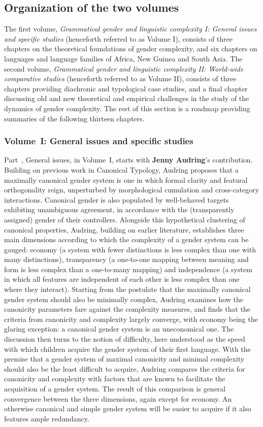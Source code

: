 \documentclass[output=collectionpaper]{langsci/langscibook}
\begin{document}
\subsection*{Organization of the two volumes}
The first volume, \textit{Grammatical gender and linguistic complexity I: General issues and specific studies} (henceforth referred to as Volume I), consists of three chapters on the theoretical foundations of gender complexity, and six chapters on languages and language families of Africa, New Guinea and South Asia. The second volume, \textit{Grammatical gender and linguistic complexity II: World-wide comparative studies} (henceforth referred to as Volume II), consists of three chapters providing diachronic and typological case studies, and a final chapter discussing old and new theoretical and empirical challenges in the study of the dynamics of gender complexity. The rest of this section is a roadmap providing summaries of the following thirteen chapters.

\subsubsection*{Volume~I: General issues and specific studies}
Part~\ptgeneral{}, General issues, in Volume~I, starts with \textbf{Jenny Audring}'s contribution. Building on previous work in Canonical Typology, Audring proposes that a maximally canonical gender system is one in which formal clarity and featural orthogonality reign, unperturbed by morphological cumulation and cross-category interactions. Canonical gender is also populated by well-behaved targets exhibiting unambiguous agreement, in accordance with the (transparently assigned) gender of their controllers. Alongside this hypothetical clustering of canonical properties, Audring, building on earlier literature, establishes three main dimensions according to which the complexity of a gender system can be gauged: economy (a system with fewer distinctions is less complex than one with many distinctions), transparency (a one-to-one mapping between meaning and form is less complex than a one-to-many mapping) and independence (a system in which all features are independent of each other is less complex than one where they interact). Starting from the postulate that the maximally canonical gender system should also be minimally complex, Audring examines how the canonicity parameters fare against the complexity measures, and finds that the criteria from canonicity and complexity largely converge, with economy being the glaring exception: a canonical gender system is an uneconomical one. The discussion then turns to the notion of difficulty, here understood as the speed with which children acquire the gender system of their first language. With the premise that a gender system of maximal canonicity and minimal complexity should also be the least difficult to acquire, Audring compares the criteria for canonicity and complexity with factors that are known to facilitate the acquisition of a gender system. The result of this comparison is general convergence between the three dimensions, again except for economy. An otherwise canonical and simple gender system will be easier to acquire if it also features ample redundancy.
\end{document}
